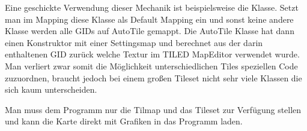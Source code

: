 Eine geschickte Verwendung dieser Mechanik ist beispielsweise die  Klasse. Setzt man im Mapping diese Klasse als Default Mapping ein und sonst keine andere Klasse werden alle GIDs auf AutoTile gemappt. Die AutoTile Klasse hat dann einen Konstruktor mit einer Settingsmap und berechnet aus der darin enthaltenen GID zurück welche Textur im TILED MapEditor verwendet wurde. Man verliert zwar somit die Möglichkeit unterschiedlichen Tiles speziellen Code zuzuordnen, braucht jedoch bei einem großen Tileset nicht sehr viele Klassen die sich kaum unterscheiden.

Man muss dem Programm nur die Tilmap und das Tileset zur Verfügung stellen und kann die Karte direkt mit Grafiken in das Programm laden.